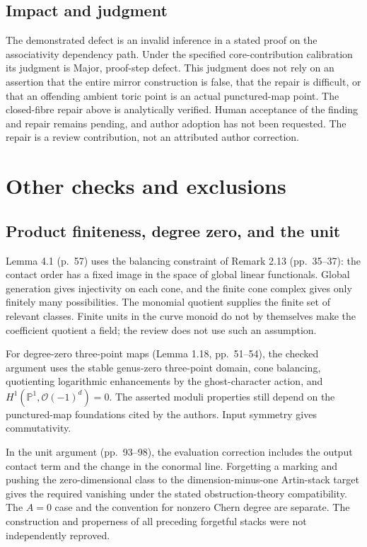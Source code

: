 \documentclass[10pt]{article}
\begin{document}
\subsection*{Impact and judgment}
The demonstrated defect is an invalid inference in a stated proof on the associativity dependency path. Under the specified core-contribution calibration its judgment is Major, proof-step defect. This judgment does not rely on an assertion that the entire mirror construction is false, that the repair is difficult, or that an offending ambient toric point is an actual punctured-map point. The closed-fibre repair above is analytically verified. Human acceptance of the finding and repair remains pending, and author adoption has not been requested. The repair is a review contribution, not an attributed author correction.\par
\section*{Other checks and exclusions}
\subsection*{Product finiteness, degree zero, and the unit}
Lemma 4.1 (p. 57) uses the balancing constraint of Remark 2.13 (pp. 35–37): the contact order has a fixed image in the space of global linear functionals. Global generation gives injectivity on each cone, and the finite cone complex gives only finitely many possibilities. The monomial quotient supplies the finite set of relevant classes. Finite units in the curve monoid do not by themselves make the coefficient quotient a field; the review does not use such an assumption.\par
For degree-zero three-point maps (Lemma 1.18, pp. 51–54), the checked argument uses the stable genus-zero three-point domain, cone balancing, quotienting logarithmic enhancements by the ghost-character action, and \(H^1(\mathbb P^1,\mathcal O(-1)^d)=0\). The asserted moduli properties still depend on the punctured-map foundations cited by the authors. Input symmetry gives commutativity.\par
In the unit argument (pp. 93–98), the evaluation correction includes the output contact term and the change in the conormal line. Forgetting a marking and pushing the zero-dimensional class to the dimension-minus-one Artin-stack target gives the required vanishing under the stated obstruction-theory compatibility. The \(A=0\) case and the convention for nonzero Chern degree are separate. The construction and properness of all preceding forgetful stacks were not independently reproved.\par
\end{document}
